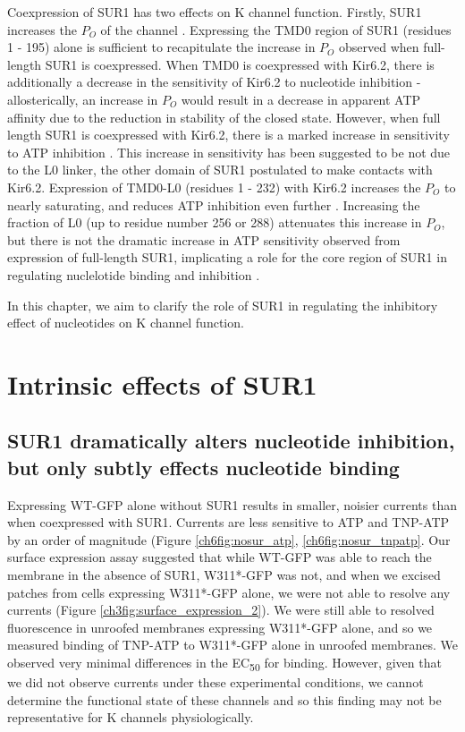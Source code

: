 Coexpression of SUR1 has two effects on K\ATP{} channel function.
Firstly, SUR1 increases the $P_O$ of the channel \cite{tucker_truncation_1997, john_sulphonylurea_1998, chan_n-terminal_2003-1}.
Expressing the TMD0 region of SUR1 (residues 1 - 195) alone is sufficient to recapitulate the increase in $P_O$ observed when full-length SUR1 is coexpressed\cite{babenko_sur_2003-1, chan_n-terminal_2003-1}.
When TMD0 is coexpressed with Kir6.2, there is additionally a decrease in the sensitivity of Kir6.2 to nucleotide inhibition - allosterically, an increase in $P_O$ would result in a decrease in apparent ATP affinity due to the reduction in stability of the closed state.
However, when full length SUR1 is coexpressed with Kir6.2, there is a marked increase in sensitivity to ATP inhibition \cite{tucker_truncation_1997, john_sulphonylurea_1998, chan_n-terminal_2003-1, ribalet_atp-sensitive_2006}.
This increase in sensitivity has been suggested to be not due to the L0 linker, the other domain of SUR1 postulated to make contacts with Kir6.2.
Expression of TMD0-L0 (residues 1 - 232) with Kir6.2 increases the $P_O$ to nearly saturating, and reduces ATP inhibition even further \cite{babenko_sur_2003-1}.
Increasing the fraction of L0 (up to residue number 256 or 288) attenuates this increase in $P_O$, but there is not the dramatic increase in ATP sensitivity observed from expression of full-length SUR1, implicating a role for the core region of SUR1 in regulating nuclelotide binding and inhibition \cite{puljung_cryo-electron_2018}.

In this chapter, we aim to clarify the role of SUR1 in regulating the inhibitory effect of nucleotides on K\ATP{} channel function.

\section{Intrinsic effects of SUR1}

\subsection{SUR1 dramatically alters nucleotide inhibition, but only subtly effects nucleotide binding}
Expressing WT-GFP alone without SUR1 results in smaller, noisier currents than when coexpressed with SUR1.
Currents are less sensitive to ATP and TNP-ATP by an order of magnitude (Figure \ref{ch6fig:nosur_atp}, \ref{ch6fig:nosur_tnpatp}.
Our surface expression assay suggested that while WT-GFP was able to reach the membrane in the absence of SUR1, W311*-GFP was not, and when we excised patches from cells expressing W311*-GFP alone, we were not able to resolve any currents (Figure \ref{ch3fig:surface_expression_2}).
We were still able to resolved fluorescence in unroofed membranes expressing W311*-GFP alone, and so we measured binding of TNP-ATP to W311*-GFP alone in unroofed membranes.
We observed very minimal differences in the EC\textsubscript{50} for binding.
However, given that we did not observe currents under these experimental conditions, we cannot determine the functional state of these channels and so this finding may not be representative for K\ATP{} channels physiologically.

